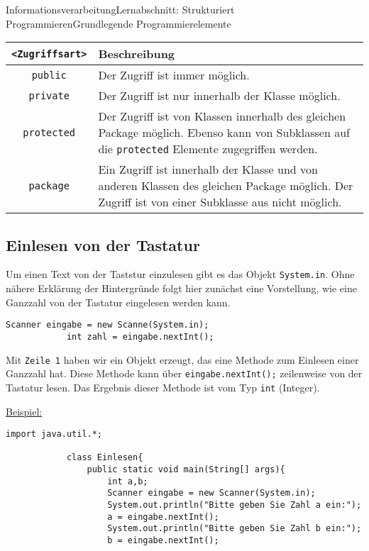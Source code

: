 \documentclass[11pt,oneside,openany,headings=optiontotoc,11pt,numbers=noenddot]{article}
\begin{document}
\begin{worksheet}{Informationsverarbeitung}{Lernabschnitt: Strukturiert Programmieren}{Grundlegende Programmierelemente}
\begin{tabularx}{\textwidth}{cX}
			\textbf{{\lstinline[style=JavaInputStyle]{<Zugriffsart>}}} & \textbf{Beschreibung}\\
			\hline
			\hline
			{\lstinline[style=JavaInputStyle]{public}} & Der Zugriff ist immer möglich. \\
			\hline
			{\lstinline[style=JavaInputStyle]{private}} & Der Zugriff ist nur innerhalb der Klasse möglich.\\
			\hline
			{\lstinline[style=JavaInputStyle]{protected}} & Der Zugriff ist von Klassen innerhalb des gleichen Package möglich. Ebenso kann von Subklassen auf die {\lstinline[style=JavaInputStyle]{protected}} Elemente zugegriffen werden. \\
			\hline
			\hline
			{\lstinline[style=JavaInputStyle]{package}} & Ein Zugriff ist innerhalb der Klasse und von anderen Klassen des gleichen Package möglich. Der Zugriff ist von einer Subklasse aus nicht möglich.\\
			\hline
			\hline
		\end{tabularx}
		\subsection{Einlesen von der Tastatur}
		Um einen Text von der Taststur einzulesen gibt es das Objekt \lstinline[style=JavaInputStyle]|System.in|. Ohne nähere Erklärung der Hintergründe folgt hier zunächst eine Vorstellung, wie eine Ganzzahl von der Tastatur eingelesen werden kann.
		\begin{lstlisting}[style=JavaInputStyle]
			Scanner eingabe = new Scanne(System.in);
			int zahl = eingabe.nextInt();
		\end{lstlisting}
		Mit \texttt{Zeile 1} haben wir ein Objekt erzeugt, das eine Methode zum Einlesen einer Ganzzahl hat. Diese Methode kann über \lstinline[style=JavaInputStyle]|eingabe.nextInt();| zeilenweise von der Tastatur lesen. Das Ergebnis dieser Methode ist vom Typ \lstinline[style=JavaInputStyle]|int| (Integer).\\
		\par\noindent
		\underline{Beispiel:}
		\begin{lstlisting}[style=JavaInputStyle]
			import java.util.*;
			
			class Einlesen{
				public static void main(String[] args){
					int a,b;
					Scanner eingabe = new Scanner(System.in);
					System.out.println("Bitte geben Sie Zahl a ein:");
					a = eingabe.nextInt();
					System.out.println("Bitte geben Sie Zahl b ein:");
					b = eingabe.nextInt();
					

\end{lstlisting}
\end{worksheet}
\end{document}
